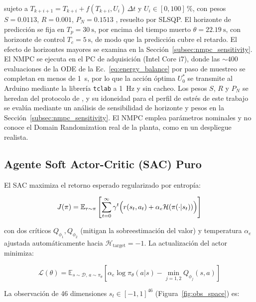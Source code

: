 \documentclass[processes,article,submit,moreauthors,pdftex]{Definitions/mdpi}
\newcommand{\dt}{\Delta t}
\begin{document}
sujeto a $T_{k+i+1} = T_{k+i} + f(T_{k+i}, U_i)\,\dt$ y $U_i \in [0,100]\,\%$,
con pesos $S = 0.0113$, $R = 0.001$, $P_N = 0.1513$ \cite{SozaMamani2025},
resuelto por SLSQP. El horizonte de predicción se fija en
$T_p = \SI{30}{\second}$, por encima del tiempo muerto
$\theta = \SI{22.19}{\second}$, con horizonte de control
$T_c = \SI{5}{\second}$, de modo que la predicción cubre el retardo. El
efecto de horizontes mayores se examina en la
Sección~\ref{subsec:nmpc_sensitivity}. El NMPC se ejecuta en el PC de
adquisición (Intel Core i7), donde las $\sim\!400$ evaluaciones de la ODE de
la Ec.~\eqref{eq:energy_balance} por paso de muestreo se completan en menos
de \SI{1}{\second}, por lo que la acción óptima $U_0^\ast$ se transmite al
Arduino mediante la librería \texttt{tclab} a \SI{1}{\hertz} y sin cacheo. Los
pesos $S$, $R$ y $P_N$ se heredan del protocolo de \cite{SozaMamani2025}, y su
idoneidad para el perfil de estrés de este trabajo se evalúa mediante un
análisis de sensibilidad de horizonte y pesos en la
Sección~\ref{subsec:nmpc_sensitivity}. El NMPC emplea parámetros nominales y
no conoce el Domain Randomization real de la planta, como en un despliegue
realista.

\subsection{Agente Soft Actor-Critic (SAC) Puro}
\label{subsec:sac}

El SAC \cite{Haarnoja2018} maximiza el retorno esperado regularizado por
entropía:

\begin{equation}
  \label{eq:sac_obj}
  J(\pi) = \mathbb{E}_{\tau \sim \pi}
    \left[\sum_{t=0}^{\infty} \gamma^t \Bigl(
      r(s_t, a_t) + \alpha_e \mathcal{H}(\pi(\cdot|s_t))
    \Bigr)\right]
\end{equation}

con dos críticos $Q_{\phi_1}, Q_{\phi_2}$ (mitigan la sobreestimación del
valor) y temperatura $\alpha_e$ ajustada automáticamente hacia
$\mathcal{H}_{\mathrm{target}} = -1$. La actualización del actor minimiza:

\begin{equation}
  \label{eq:actor_update}
  \mathcal{L}(\theta) = \mathbb{E}_{s\sim\mathcal{D},\, a\sim\pi_\theta}
  \left[\alpha_e \log\pi_\theta(a|s) - \min_{j=1,2} Q_{\phi_j}(s,a)\right]
\end{equation}

La observación de 46 dimensiones $s_t \in [-1,1]^{46}$
(Figura~\ref{fig:obs_space}) es:
\end{document}
